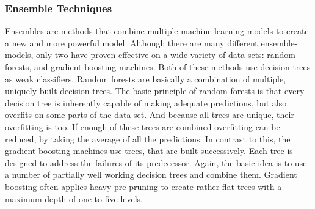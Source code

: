 \subsubsection{Ensemble Techniques}
Ensembles are methods that combine multiple machine learning models to create a new and more powerful model. Although there are many different ensemble-models, only two have proven effective on a wide variety of data sets: random forests, and gradient boosting machines. Both of these methods use decision trees as weak classifiers. Random forests are basically a combination of multiple, uniquely built decision trees. The basic principle of random forests is that every decision tree is inherently capable of making adequate predictions, but also overfits on some parts of the data set. And because all trees are unique, their overfitting is too. If enough of these trees are combined overfitting can be reduced, by taking the average of all the predictions. In contrast to this, the gradient boosting machines use trees, that are built successively. Each tree is designed to address the failures of its predecessor. Again, the basic idea is to use a number of partially well working decision trees and combine them. Gradient boosting often applies heavy pre-pruning to create rather flat trees with a maximum depth of one to five levels. 
 
%
